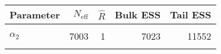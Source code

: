\begin{table}[!h]
\centering
\begin{tabular}{>{\raggedright\arraybackslash}p{2cm}rrrr}
\toprule
Parameter & $N_{\text{eff}}$ & $\widehat{R}$ & Bulk ESS & Tail ESS\\
\midrule
\cellcolor{gray!6}{$\alpha_{0}$} & \cellcolor{gray!6}{6018} & \cellcolor{gray!6}{1} & \cellcolor{gray!6}{6050} & \cellcolor{gray!6}{9732}\\
$\alpha_{2}$ & 7003 & 1 & 7023 & 11552\\
\cellcolor{gray!6}{$\rho$} & \cellcolor{gray!6}{4737} & \cellcolor{gray!6}{1} & \cellcolor{gray!6}{4767} & \cellcolor{gray!6}{4389}\\
\bottomrule
\end{tabular}
\end{table}